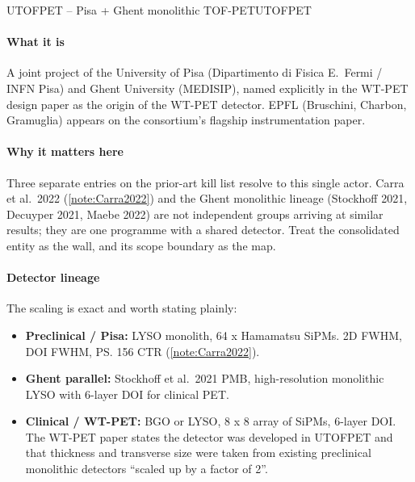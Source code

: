 \begin{programnote}{UTOFPET -- Pisa + Ghent monolithic TOF-PET}{UTOFPET}

\paragraph{What it is}
A joint project of the University of Pisa (Dipartimento di Fisica E.\ Fermi /
INFN Pisa) and Ghent University (MEDISIP), named explicitly in the WT-PET design
paper as the origin of the WT-PET detector. EPFL (Bruschini, Charbon, Gramuglia)
appears on the consortium's flagship instrumentation paper.

\paragraph{Why it matters here}
Three separate entries on the prior-art kill list resolve to this single actor.
Carra et al.\ 2022 (\ref{note:Carra2022}) and the Ghent monolithic lineage
(Stockhoff 2021, Decuyper 2021, Maebe 2022) are not independent groups arriving
at similar results; they are one programme with a shared detector. Treat the
consolidated entity as the wall, and its scope boundary as the map.

\paragraph{Detector lineage}
The scaling is exact and worth stating plainly:

\begin{itemize}
	\item \textbf{Preclinical / Pisa:} 
		LYSO monolith, 64 x  Hamamatsu SiPMs.
		 2D FWHM,  DOI FWHM, \ps{156} CTR
		(\ref{note:Carra2022}).
	\item \textbf{Ghent parallel:} Stockhoff et al.\ 2021 PMB,
		high-resolution monolithic LYSO with 6-layer DOI for clinical PET.
	\item \textbf{Clinical / WT-PET:} 
		BGO or LYSO, 8 x 8 array of  SiPMs,
		6-layer DOI. The WT-PET paper states the detector was developed in
		UTOFPET and that thickness and transverse size were taken from existing
		preclinical monolithic detectors ``scaled up by a factor of 2''.
\end{itemize}


\end{programnote}
